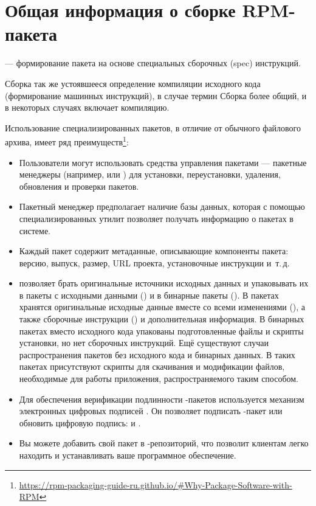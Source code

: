 \hypertarget{3}{\chapter{Общая информация о сборке RPM-пакета}}\label{software-used-for-packaging}

 --- формирование пакета на основе специальных сборочных (spec) инструкций.

Сборка так же устоявшееся определение компиляции исходного кода (формирование машинных
инструкций), в случае  термин Сборка более общий, и в некоторых случаях включает
компиляцию.

Использование специализированных пакетов, в отличие от обычного файлового архива, имеет ряд
преимуществ\footnote{\href{https://rpm-packaging-guide-ru.github.io/\#Why-Package-Software-with-RPM}
	{https://rpm-packaging-guide-ru.github.io/\#Why-Package-Software-with-RPM}}:

\begin{itemize}
	\item Пользователи могут использовать средства управления пакетами --- пакетные менеджеры
		(например,  или 	) для установки, переустановки, удаления,
		обновления и проверки  пакетов.
	\item Пакетный менеджер  предполагает наличие базы данных, которая с помощью специализированных
		утилит позволяет получать информацию о пакетах в системе.
	\item Каждый пакет  содержит метаданные, описывающие компоненты пакета: версию, выпуск,
		размер, URL проекта, установочные инструкции и~т.\,д.
	\item {} позволяет брать оригинальные источники исходных данных и упаковывать их в
		пакеты с исходными данными () и в бинарные пакеты (). В пакетах 
		хранятся оригинальные исходные данные вместе со всеми изменениями (), а также сборочные
		инструкции () и дополнительная информация. В бинарных пакетах вместо исходного кода
		упакованы подготовленные файлы и скрипты установки, но нет сборочных инструкций. Ещё существуют
		случаи распространения пакетов без исходного кода и бинарных данных. В таких пакетах присутствуют
		скрипты для скачивания и модификации файлов, необходимые для работы приложения, распространяемого таким способом.
	\item Для обеспечения верификации подлинности -пакетов используется механизм электронных цифровых
		подписей . Он позволяет подписать -пакет или обновить цифровую подпись:
	 и .
	\item Вы можете добавить свой пакет в -репозиторий, что позволит клиентам легко находить и
		устанавливать ваше программное обеспечение.
\end{itemize}

